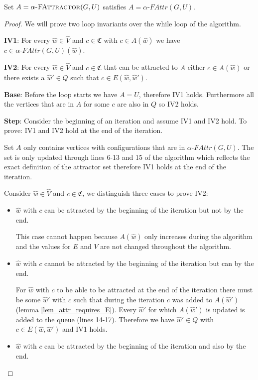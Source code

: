 \begin{theorem}
Set $A = \textsc{$\alpha$-FAttractor}(G,U)$ satisfies $A = \alpha\textit{-FAttr}(G,U)$.
	\begin{proof} We will prove two loop invariants over the while loop of the algorithm.
		
		\textbf{IV1}: For every $\hat{w} \in \hat{V}$ and $c \in \mathfrak{C}$ with $c \in A(\hat{w})$ we have $c \in \alpha\textit{-FAttr}(G,U)(\hat{w})$.
		
		\textbf{IV2}: For every $\hat{w} \in \hat{V}$ and $c \in \mathfrak{C}$ that can be attracted to $A$ either $c \in A(\hat{w})$ or there exists a $\hat{w}' \in Q$ such that $c \in E(\hat{w},\hat{w}')$.
		
		\textbf{Base}: Before the loop starts we have $A = U$, therefore IV1 holds. Furthermore all the vertices that are in $A$ for some $c$ are also in $Q$ so IV2 holds.
		
		\textbf{Step}: Consider the beginning of an iteration and assume IV1 and IV2 hold. To prove: IV1 and IV2 hold at the end of the iteration.
		
		Set $A$ only contains vertices with configurations that are in $\alpha\textit{-FAttr}(G,U)$. The set is only updated through lines 6-13 and 15 of the algorithm which reflects the exact definition of the attractor set therefore IV1 holds at the end of the iteration.
		
		Consider $\hat{w} \in \hat{V}$ and $c \in \mathfrak{C}$, we distinguish three cases to prove IV2:
		\begin{itemize}
			\item $\hat{w}$ with $c$ can be attracted by the beginning of the iteration but not by the end.
			
			This case cannot happen because $A(\hat{w})$ only increases during the algorithm and the values for $E$ and $V$ are not changed throughout the algorithm.
			\item $\hat{w}$ with $c$ cannot be attracted by the beginning of the iteration but can by the end.
			
			For $\hat{w}$ with $c$ to be able to be attracted at the end of the iteration there must be some $\hat{w}'$ with $c$ such that during the iteration $c$ was added to $A(\hat{w}')$ (lemma \ref{lem_attr_requires_E}). Every $\hat{w}'$ for which $A(\hat{w}')$ is updated is added to the queue (lines 14-17). Therefore we have $\hat{w}' \in Q$ with $c \in E(\hat{w},\hat{w}')$ and IV1 holds.
			\item $\hat{w}$ with $c$ can be attracted by the beginning of the iteration and also by the end.
			

\end{itemize}
\end{proof}
\end{theorem}
